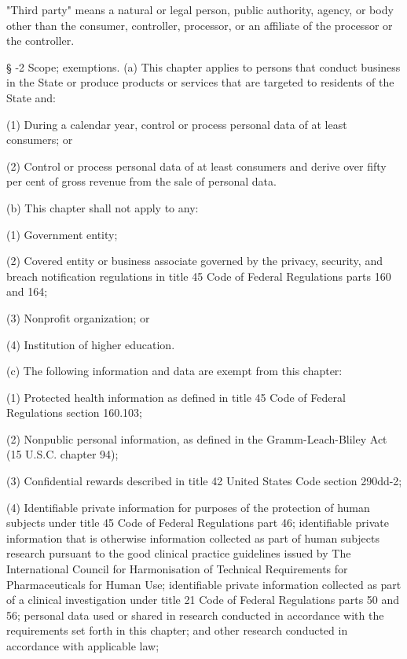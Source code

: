      "Third party" means a natural or legal person, public authority, agency, or body other than the consumer, controller, processor, or an affiliate of the processor or the controller.

     §   -2  Scope; exemptions.  (a)  This chapter applies to persons that conduct business in the State or produce products or services that are targeted to residents of the State and:

     (1)  During a calendar year, control or process personal data of at least               consumers; or

     (2)  Control or process personal data of at least               consumers and derive over fifty per cent of gross revenue from the sale of personal data.

     (b)  This chapter shall not apply to any:

     (1)  Government entity;

     (2)  Covered entity or business associate governed by the privacy, security, and breach notification regulations in title 45 Code of Federal Regulations parts 160 and 164;

     (3)  Nonprofit organization; or

     (4)  Institution of higher education.

     (c)  The following information and data are exempt from this chapter:

     (1)  Protected health information as defined in title 45 Code of Federal Regulations section 160.103;

     (2)  Nonpublic personal information, as defined in the Gramm-Leach-Bliley Act (15 U.S.C. chapter 94);

     (3)  Confidential rewards described in title 42 United States Code section 290dd-2;

     (4)  Identifiable private information for purposes of the protection of human subjects under title 45 Code of Federal Regulations part 46; identifiable private information that is otherwise information collected as part of human subjects research pursuant to the good clinical practice guidelines issued by The International Council for Harmonisation of Technical Requirements for Pharmaceuticals for Human Use; identifiable private information collected as part of a clinical investigation under title 21 Code of Federal Regulations parts 50 and 56; personal data used or shared in research conducted in accordance with the requirements set forth in this chapter; and other research conducted in accordance with applicable law;


